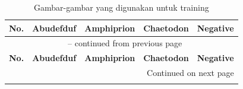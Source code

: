 \begin{longtable}{|c|c|c|c|c|}
	\caption{Gambar-gambar yang digunakan untuk training} \label{tab: Training set} \\
    \hline
    \textbf{No.} & \textbf{Abudefduf} & \textbf{Amphiprion} & \textbf{Chaetodon} & \textbf{Negative} \\
    \hline
    \endfirsthead
    \multicolumn{5}{c}{{\tablename\ \thetable{} -- continued from previous page}} \\
    \hline
    \textbf{No.} & \textbf{Abudefduf} & \textbf{Amphiprion} & \textbf{Chaetodon} & \textbf{Negative} \\
    \hline
    \endhead
    \hline \multicolumn{5}{|r|}{{Continued on next page}} \\ \hline
    \endfoot
    \hline
    \endlastfoot


\end{longtable}
